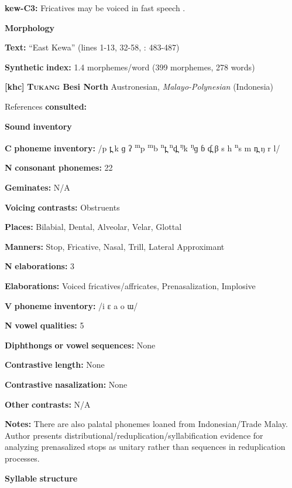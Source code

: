 \begin{styleBody}
\textbf{kew-C3:} Fricatives may be voiced in fast speech \citep[24]{Franklin1971}.

\textbf{Morphology}

\textbf{Text:} “East Kewa” (lines 1-13, 32-58, \citealt{FranklinFranklin1978}: 483-487)

\textbf{Synthetic} \textbf{index:} 1.4 morphemes/word (399 morphemes, 278 words)

\textbf{[khc]}   \textbf{\textsc{Tukang} \textbf{Besi} \textbf{North}}  Austronesian, \textit{Malayo-Polynesian} (Indonesia)

References \textbf{consulted:} \citet{Donohue1999}

\textbf{Sound} \textbf{inventory}

\textbf{C} \textbf{phoneme} \textbf{inventory:} /p t̪ k ɡ ʔ \textsuperscript{m}p \textsuperscript{m}b \textsuperscript{n}t̪ \textsuperscript{n}d̪ \textsuperscript{ŋ}k \textsuperscript{ŋ}ɡ ɓ ɗ̪ β s h \textsuperscript{n}s m n̪ ŋ r l/

\textbf{N} \textbf{consonant} \textbf{phonemes:} 22

\textbf{Geminates:} N/A

\textbf{Voicing} \textbf{contrasts:} Obstruents

\textbf{Places:} Bilabial, Dental, Alveolar, Velar, Glottal

\textbf{Manners:} Stop, Fricative, Nasal, Trill, Lateral Approximant

\textbf{N} \textbf{elaborations:} 3

\textbf{Elaborations:} Voiced fricatives/affricates, Prenasalization, Implosive

\textbf{V} \textbf{phoneme} \textbf{inventory:} /i ɛ a o ɯ/

\textbf{N} \textbf{vowel} \textbf{qualities:} 5

\textbf{Diphthongs} \textbf{or} \textbf{vowel} \textbf{sequences:} None

\textbf{Contrastive} \textbf{length:} None

\textbf{Contrastive} \textbf{nasalization:} None

\textbf{Other} \textbf{contrasts:} N/A

\textbf{Notes:} There are also palatal phonemes loaned from Indonesian/Trade Malay. Author presents distributional/reduplication/syllabification evidence for analyzing prenasalized stops as unitary rather than sequences in reduplication processes.

\textbf{Syllable} \textbf{structure}


\end{styleBody}
